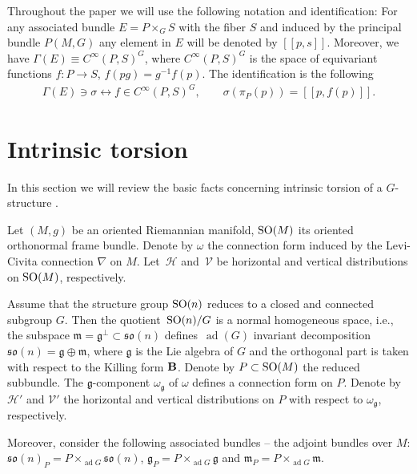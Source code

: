 \documentclass[10pt,a4paper]{amsart}
\numberwithin{equation}{section}
\begin{document}
Throughout the paper we will use the following notation and identif\/ication: For any associated bundle $E=P\times_G S$ with the f\/iber $S$ and induced by the principal bundle $P(M,G)$ any element in $E$ will be denoted by $[[p,s]]$. Moreover, we have $\Gamma(E)\equiv C^{\infty}(P,S)^G$, where $C^{\infty}(P,S)^G$ is the space of equivariant functions $f\colon P\to S$, $f(pg)=g^{-1}f(p)$. The identif\/ication is the following
\begin{gather*}
\Gamma(E)\ni\sigma\longleftrightarrow f\in C^{\infty}(P,S)^G,\qquad \sigma(\pi_P(p))=[[p,f(p)]].
\end{gather*}

\section{Intrinsic torsion}\label{section2}

In this section we will review the basic facts concerning intrinsic torsion of a $G$-structure \cite{gmc2,cw2}.

Let $(M,g)$ be an oriented Riemannian manifold, ${\rm SO}(M)$ its oriented orthonormal frame bundle. Denote by $\omega$ the connection form induced by the Levi-Civita connection $\nabla$ on $M$. Let~$\mathcal{H}$ and~$\mathcal{V}$ be horizontal and vertical distributions on ${\rm SO}(M)$, respectively.

Assume that the structure group ${\rm SO}(n)$ reduces to a closed and connected subgroup $G$. Then the quotient~${\rm SO}(n)/G$ is a normal homogeneous space, i.e., the subspace $\mathfrak{m}=\mathfrak{g}^{\bot}\subset \mathfrak{so}(n)$ def\/ines~$\operatorname{ad}(G)$ invariant decomposition $\mathfrak{so}(n)=\mathfrak{g}\oplus \mathfrak{m}$, where $\mathfrak{g}$ is the Lie algebra of $G$ and the orthogonal part is taken with respect to the Killing form ${\bf B}$. Denote by $P\subset {\rm SO}(M)$ the reduced subbundle. The $\mathfrak{g}$-component $\omega_{\mathfrak{g}}$ of $\omega$ def\/ines a connection form on $P$. Denote by $\mathcal{H}'$ and $\mathcal{V}'$ the horizontal and vertical distributions on $P$ with respect to $\omega_{\mathfrak{g}}$, respectively.

Moreover, consider the following associated bundles -- the adjoint bundles over $M$: $\mathfrak{so}(n)_P=P\times_{\operatorname{ad}G}\mathfrak{so}(n)$, $\mathfrak{g}_P=P\times_{\operatorname{ad}G}\mathfrak{g}$ and $\mathfrak{m}_P=P\times_{\operatorname{ad}G}\mathfrak{m}$.
\end{document}

